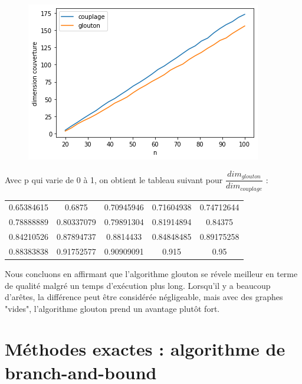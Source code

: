 \documentclass[12pt]{article}
\begin{document}
\begin{enumerate}
                    \begin{figure}[H]
                        \includegraphics[scale=0.5]{figures/qualite_p.png}
                        \centering
                    \end{figure}

                Avec p qui varie de 0 à 1, on obtient le tableau suivant pour $\dfrac{dim_{glouton}}{dim_{couplage}}$ :

                \begin{center}
                    \begin{tabular}{ |c c c c c| } 
                    \hline
                    0.65384615 & 0.6875 &    0.70945946  & 0.71604938 & 0.74712644  \\
                    0.78888889 & 0.80337079 & 0.79891304 & 0.81914894 & 0.84375   \\
                    0.84210526  & 0.87894737 & 0.8814433 & 0.84848485 & 0.89175258 \\
                    0.88383838 &  0.91752577 & 0.90909091 & 0.915   &    0.95\\
                    \hline
                    \end{tabular}
                \end{center}

                Nous concluons en affirmant que l'algorithme glouton se révele meilleur en terme de qualité malgré un temps d'exécution plus long.
                Lorsqu'il y a beaucoup d'arêtes, la différence peut être considérée négligeable, mais avec des graphes "vides", l'algorithme glouton prend un avantage plutôt fort.

        \end{enumerate}

\section{Méthodes exactes : algorithme de branch-and-bound}
\end{document}
